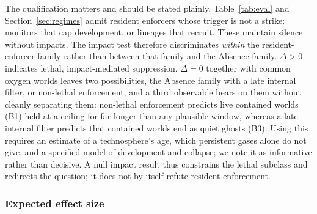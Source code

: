 \documentclass[preprint,12pt]{elsarticle}
\theoremstyle{definition}
\begin{document}
The qualification matters and should be stated plainly. Table~\ref{tab:eval} and Section~\ref{sec:regimes} admit resident enforcers whose trigger is not a strike: monitors that cap development, or lineages that recruit. These maintain silence without impacts. The impact test therefore discriminates \emph{within} the resident-enforcer family rather than between that family and the Absence family. $\Delta > 0$ indicates lethal, impact-mediated suppression. $\Delta = 0$ together with common oxygen worlds leaves two possibilities, the Absence family with a late internal filter, or non-lethal enforcement, and a third observable bears on them without cleanly separating them: non-lethal enforcement predicts live contained worlds (B1) held at a ceiling for far longer than any plausible window, whereas a late internal filter predicts that contained worlds end as quiet ghosts (B3). Using this requires an estimate of a technosphere's age, which persistent gases alone do not give, and a specified model of development and collapse; we note it as informative rather than decisive. A null impact result thus constrains the lethal subclass and redirects the question; it does not by itself refute resident enforcement.

\subsubsection{Expected effect size}
\end{document}
